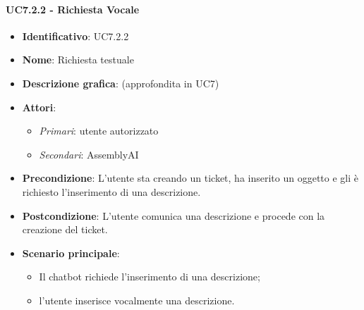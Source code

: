   \paragraph{UC7.2.2 - Richiesta Vocale}
  \begin{itemize}
     \item \textbf{Identificativo}: UC7.2.2
     \item \textbf{Nome}: Richiesta testuale
     \item \textbf{Descrizione grafica}: (approfondita in UC7)
     \item \textbf{Attori}:
     \begin{itemize} 
         \item \textit{Primari}: utente autorizzato
         \item \textit{Secondari}: AssemblyAI
     \end{itemize}
         \item \textbf{Precondizione}: L'utente sta creando un ticket, ha inserito un oggetto e gli è richiesto l'inserimento di una descrizione.
         \item \textbf{Postcondizione}: L'utente comunica una descrizione e procede con la creazione del ticket. 
      \item \textbf{Scenario principale}: 
         \begin{itemize}  
          \item Il chatbot richiede l'inserimento di una descrizione;
          \item l'utente inserisce vocalmente una descrizione.
         \end{itemize}
  \end{itemize}



